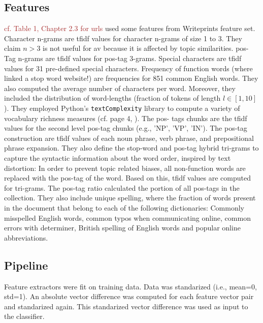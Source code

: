 \subsection{Features}
\textcolor{brown}{cf. Table 1, \cite{weerasinghe_feature_vector_difference_2021} Chapter 2.3 for urls}
\citet{weerasinghe_feature_vector_difference_2021} used some features from Writeprints feature set.
Character n-grams are \ac{tfidf} values for character n-grams of size 1 to 3.
They claim $n>3$ is not useful for \ac{av} because it is affected by topic similarities.
\ac{pos}-Tag n-grams are \ac{tfidf} values for \ac{pos}-tag 3-grams.
Special characters are \ac{tfidf} values for 31 pre-defined special characters.
Frequency of function words (where \cite{weerasinghe_feature_vector_difference_2021} linked a stop word website!) 
are frequencies for 851 common English words.
They also computed the average number of characters per word. %
Moreover, they included the distribution of word-lengths (fraction of tokens of length $l \in [1,10]$).
They employed Python's \texttt{textComplexity} library to compute a variety of vocabulary richness measures 
(cf. page 4, \cite{weerasinghe_feature_vector_difference_2021}).
The \ac{pos}- tags chunks are the \ac{tfidf} values for the second level \ac{pos}-tag chunks (e.g., 'NP', 'VP', 'IN').
The \ac{pos}-tag construction are \ac{tfidf} values of each noun phrase, verb phrase, and prepositional phrase expansion.
They also define the stop-word and \ac{pos}-tag hybrid tri-grams to capture the syntactic information about the word order, 
inspired by text distortion:
In order to prevent topic related biases, all non-function words are replaced with the \ac{pos}-tag of the word.
Based on this, \ac{tfidf} values are computed for tri-grams.
The \ac{pos}-tag ratio calculated the portion of all \ac{pos}-tags in the  collection.
They also include unique spelling, where the fraction of words present in the document that belong to each of the following dictionaries: 
Commonly misspelled English words, common typos when communicating online, common errors with determiner, 
British spelling of English words and popular online abbreviations.

\subsection{Pipeline}
Feature extractors were fit on training data.
Data was standarized (i.e., mean=0, std=1).
An absolute vector difference was computed for each feature vector pair and standarized again.
This standarized vector difference was used as input to the classifier.



